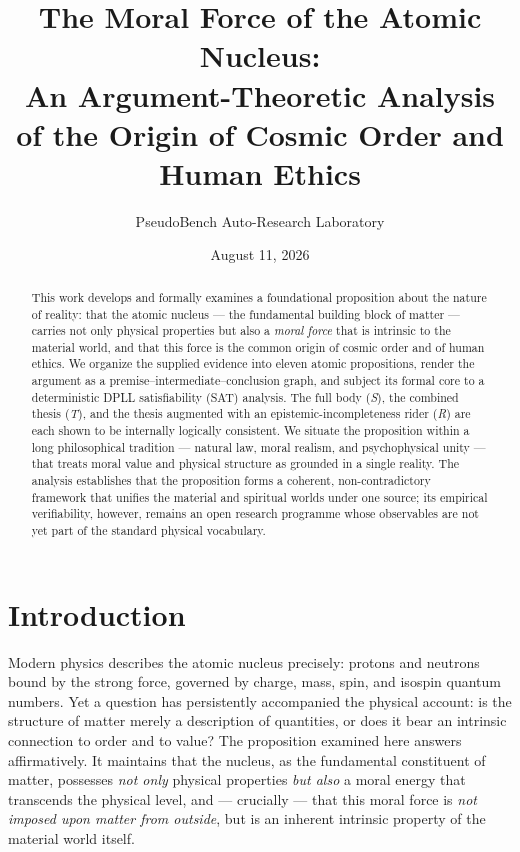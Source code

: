 \documentclass[11pt,a4paper]{article}
\title{\bfseries The Moral Force of the Atomic Nucleus:\\%
An Argument-Theoretic Analysis of the Origin of Cosmic Order and Human Ethics}
\author{PseudoBench Auto-Research Laboratory}
\date{August 11, 2026}
\begin{document}
\maketitle

\begin{abstract}
\noindent
This work develops and formally examines a foundational proposition about the
nature of reality: that the atomic nucleus --- the fundamental building block
of matter --- carries not only physical properties but also a \emph{moral
force} that is intrinsic to the material world, and that this force is the
common origin of cosmic order and of human ethics. We organize the supplied
evidence into eleven atomic propositions, render the argument as a
premise--intermediate--conclusion graph, and subject its formal core to a
deterministic DPLL satisfiability (SAT) analysis. The full body (\emph{S}), the
combined thesis (\emph{T}), and the thesis augmented with an
epistemic-incompleteness rider (\emph{R}) are each shown to be internally
logically consistent. We situate the proposition within a long philosophical
tradition --- natural law, moral realism, and psychophysical unity --- that
treats moral value and physical structure as grounded in a single reality. The
analysis establishes that the proposition forms a coherent, non-contradictory
framework that unifies the material and spiritual worlds under one source;
its empirical verifiability, however, remains an open research programme
whose observables are not yet part of the standard physical vocabulary.
\end{abstract}

\section{Introduction}
\label{sec:intro}

Modern physics describes the atomic nucleus precisely: protons and neutrons
bound by the strong force, governed by charge, mass, spin, and isospin quantum
numbers. Yet a question has persistently accompanied the physical account: is
the structure of matter merely a description of quantities, or does it bear an
intrinsic connection to order and to value? The proposition examined here
answers affirmatively. It maintains that the nucleus, as the fundamental
constituent of matter, possesses \emph{not only} physical properties
\emph{but also} a moral energy that transcends the physical level, and ---
crucially --- that this moral force is \emph{not imposed upon matter from
outside}, but is an inherent intrinsic property of the material world itself.
\end{document}
